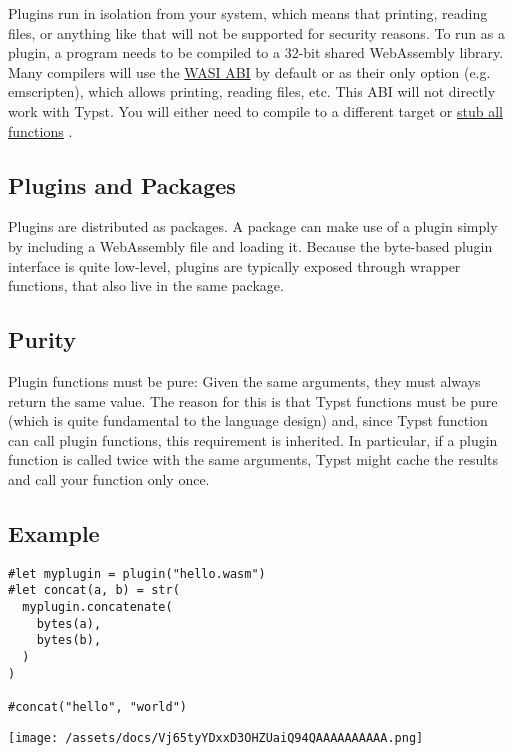 Plugins run in isolation from your system, which means that printing,
reading files, or anything like that will not be supported for security
reasons. To run as a plugin, a program needs to be compiled to a 32-bit
shared WebAssembly library. Many compilers will use the
\href{https://wasi.dev/}{WASI ABI} by default or as their only option
(e.g. emscripten), which allows printing, reading files, etc. This ABI
will not directly work with Typst. You will either need to compile to a
different target or
\href{https://github.com/astrale-sharp/wasm-minimal-protocol/blob/master/wasi-stub}{stub
all functions} .

\subsection{Plugins and Packages}\label{plugins-and-packages}

Plugins are distributed as packages. A package can make use of a plugin
simply by including a WebAssembly file and loading it. Because the
byte-based plugin interface is quite low-level, plugins are typically
exposed through wrapper functions, that also live in the same package.

\subsection{Purity}\label{purity}

Plugin functions must be pure: Given the same arguments, they must
always return the same value. The reason for this is that Typst
functions must be pure (which is quite fundamental to the language
design) and, since Typst function can call plugin functions, this
requirement is inherited. In particular, if a plugin function is called
twice with the same arguments, Typst might cache the results and call
your function only once.

\subsection{Example}\label{example}

\begin{verbatim}
#let myplugin = plugin("hello.wasm")
#let concat(a, b) = str(
  myplugin.concatenate(
    bytes(a),
    bytes(b),
  )
)

#concat("hello", "world")
\end{verbatim}

\texttt{[image: /assets/docs/Vj65tyYDxxD3OHZUaiQ94QAAAAAAAAAA.png]}

